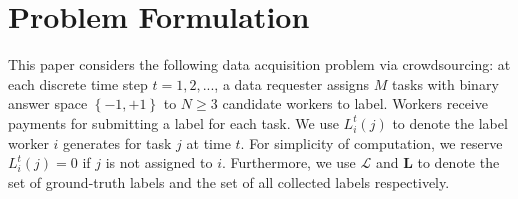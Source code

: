 \documentclass{article}
\begin{document}

\section{Problem Formulation}
\label{PF}
This paper considers the following data acquisition problem via crowdsourcing: at each discrete time step $t=1,2,...$, a data requester assigns $M$ tasks with binary answer space $\left\{-1,+1\right\}$ to $N \geq 3$ candidate workers to label. Workers receive payments for submitting a label for each task. We use $L^t_i(j)$ to denote the label worker $i$ generates for task $j$ at time $t$. For simplicity of computation, we reserve $L^t_i(j) = 0$ if  $j$ is not assigned to $i$. Furthermore, we use $\mathcal{L}$ and $\bm{L}$ to denote the set of ground-truth labels and  the set of all collected labels respectively.
\end{document}
